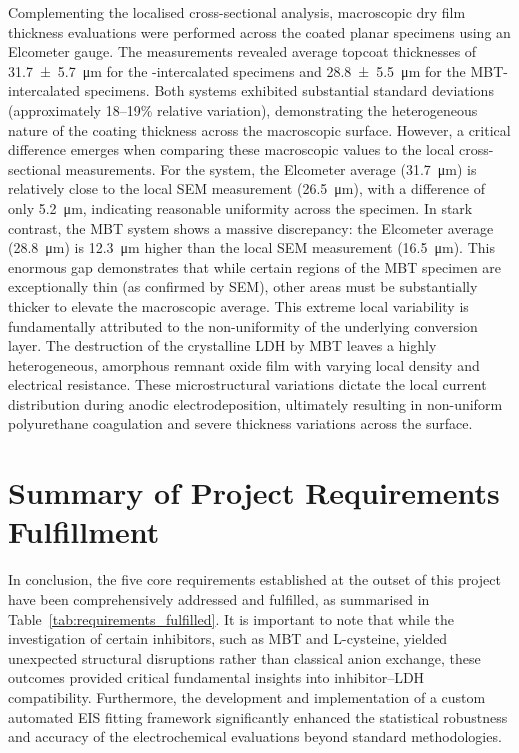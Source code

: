 \documentclass[11pt,twoside,a4paper,final]{report}
\begin{document}
Complementing the localised cross-sectional analysis, macroscopic dry film thickness evaluations were performed across the coated planar specimens using an Elcometer gauge. The measurements revealed average topcoat thicknesses of \qty{31.7 \pm 5.7}{\micro\meter} for the -intercalated specimens and \qty{28.8 \pm 5.5}{\micro\meter} for the MBT-intercalated specimens. Both systems exhibited substantial standard deviations (approximately 18--19\% relative variation), demonstrating the heterogeneous nature of the coating thickness across the macroscopic surface. However, a critical difference emerges when comparing these macroscopic values to the local cross-sectional measurements. For the  system, the Elcometer average (\qty{31.7}{\micro\meter}) is relatively close to the local SEM measurement (\qty{26.5}{\micro\meter}), with a difference of only \qty{5.2}{\micro\meter}, indicating reasonable uniformity across the specimen. In stark contrast, the MBT system shows a massive discrepancy: the Elcometer average (\qty{28.8}{\micro\meter}) is \qty{12.3}{\micro\meter} higher than the local SEM measurement (\qty{16.5}{\micro\meter}). This enormous gap demonstrates that while certain regions of the MBT specimen are exceptionally thin (as confirmed by SEM), other areas must be substantially thicker to elevate the macroscopic average. This extreme local variability is fundamentally attributed to the non-uniformity of the underlying conversion layer. The destruction of the crystalline LDH by MBT leaves a highly heterogeneous, amorphous remnant oxide film with varying local density and electrical resistance. These microstructural variations dictate the local current distribution during anodic electrodeposition, ultimately resulting in non-uniform polyurethane coagulation and severe thickness variations across the surface.

\newpage

\section{Summary of Project Requirements Fulfillment}
\label{sec:requirements_summary}

In conclusion, the five core requirements established at the outset of this project have been comprehensively addressed and fulfilled, as summarised in Table~\ref{tab:requirements_fulfilled}. It is important to note that while the investigation of certain inhibitors, such as MBT and L-cysteine, yielded unexpected structural disruptions rather than classical anion exchange, these outcomes provided critical fundamental insights into inhibitor--LDH compatibility. Furthermore, the development and implementation of a custom automated EIS fitting framework significantly enhanced the statistical robustness and accuracy of the electrochemical evaluations beyond standard methodologies.
\end{document}
